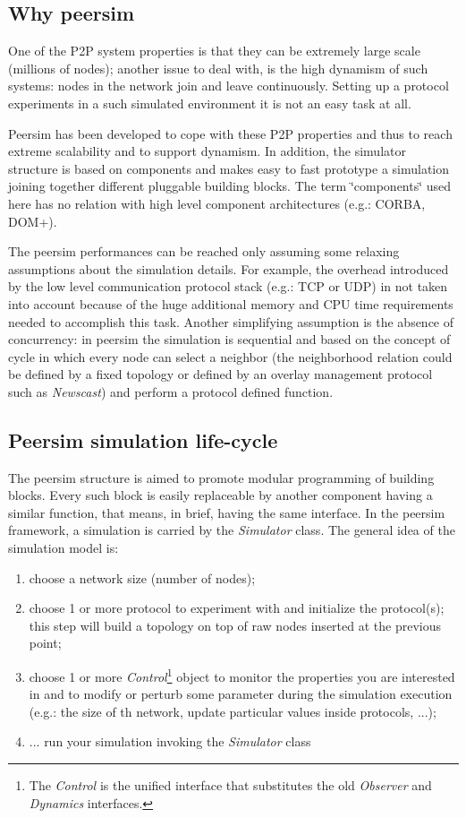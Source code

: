 \documentclass[a4paper,11pt]{article}
\begin{document}
\subsection{Why peersim}

One of the P2P system properties is that they can be extremely large
scale (millions of nodes); another issue to deal with, is the high
dynamism of such systems: nodes in the network join and leave continuously.
Setting up a protocol experiments in a such simulated environment it
is not an easy task at all.

Peersim has been developed to cope with these P2P properties and thus
to reach extreme scalability and to support dynamism. In addition,
the simulator structure is based on components and makes easy to fast
prototype a simulation joining together different pluggable building
blocks. The term \char`\"{}components\char`\"{} used here has no relation
with high level component architectures (e.g.: CORBA, DOM+).

The peersim performances can be reached only assuming some relaxing
assumptions about the simulation details. For example, the overhead
introduced by the low level communication protocol stack (e.g.: TCP
or UDP) in not taken into account because of the huge additional memory
and CPU time requirements needed to accomplish this task. Another simplifying
assumption is the absence of concurrency: in peersim the simulation
is sequential and based on the concept of cycle in which every node
can select a neighbor (the neighborhood relation could be defined
by a fixed topology or defined by an overlay management protocol such
as \emph{Newscast}) and perform a protocol defined function.


\subsection{Peersim simulation life-cycle}

The peersim structure is aimed to promote modular programming of building
blocks. Every such block is easily replaceable by another component
having a similar function, that means, in brief, having the same interface.
In the peersim framework, a simulation is carried by the \emph{Simulator}
class. The general idea of the simulation model is: 

\begin{enumerate}
\item choose a network size (number of nodes); 
\item choose 1 or more protocol to experiment with and initialize
the protocol(s); this step will build a topology on top of raw nodes
inserted at the previous point;
\item choose 1 or more \emph{Control}\footnote{The \emph{Control} is
  the unified interface that substitutes the old \emph{Observer} and
  \emph{Dynamics} interfaces.}
 object to monitor the properties
  you are interested in and to modify or perturb some parameter during
  the simulation execution (e.g.: the size of th
network, update particular values inside protocols, ...); 
\item ... run your simulation invoking the \emph{Simulator} class
\end{enumerate}
\end{document}
